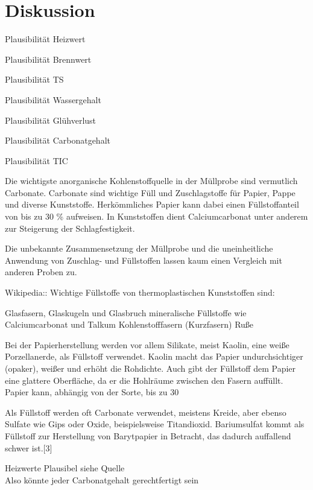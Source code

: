 \chapter{Diskussion}
\label{sec:diskussion}



Plausibilität Heizwert

Plausibilität Brennwert

Plausibilität TS

Plausibilität Wassergehalt

Plausibilität Glühverlust

Plausibilität Carbonatgehalt

Plausibilität TIC


Die wichtigste anorganische Kohlenstoffquelle in der Müllprobe sind vermutlich Carbonate.
Carbonate sind wichtige Füll und Zuschlagstoffe für Papier, Pappe und diverse Kunststoffe. Herkömmliches Papier kann dabei einen Füllstoffanteil von bis zu 30 \% aufweisen. In Kunststoffen dient Calciumcarbonat unter anderem zur Steigerung der Schlagfestigkeit. 

Die unbekannte Zusammensetzung der Müllprobe und die uneinheitliche Anwendung von Zuschlag- und Füllstoffen lassen kaum einen Vergleich mit anderen Proben zu. 



Wikipedia::
Wichtige Füllstoffe von thermoplastischen Kunststoffen sind:

Glasfasern, Glaskugeln und Glasbruch
mineralische Füllstoffe wie Calciumcarbonat und Talkum
Kohlenstofffasern (Kurzfasern)
Ruße

Bei der Papierherstellung werden vor allem Silikate, meist Kaolin, eine weiße Porzellanerde, als Füllstoff verwendet. Kaolin macht das Papier undurchsichtiger (opaker), weißer und erhöht die Rohdichte. Auch gibt der Füllstoff dem Papier eine glattere Oberfläche, da er die Hohlräume zwischen den Fasern auffüllt. Papier kann, abhängig von der Sorte, bis zu 30 %

Als Füllstoff werden oft Carbonate verwendet, meistens Kreide, aber ebenso Sulfate wie Gips oder Oxide, beispielsweise Titandioxid. Bariumsulfat kommt als Füllstoff zur Herstellung von Barytpapier in Betracht, das dadurch auffallend schwer ist.[3] 

Heizwerte Plausibel siehe Quelle\\

Also könnte jeder Carbonatgehalt gerechtfertigt sein\\

